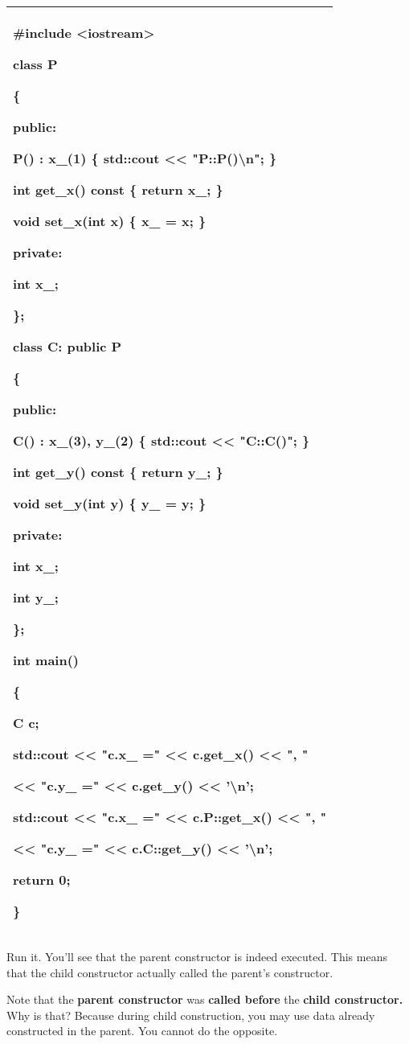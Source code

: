 \documentclass[
]{article}
\begin{document}
\begin{longtable}[]{@{}l@{}}
\toprule
\endhead
\begin{minipage}[t]{0.97\columnwidth}\raggedright
\#include \textless iostream\textgreater{}

class P

\{

public:

P() : x\_(1) \{ \textbf{std::cout \textless\textless{}
"P::P()\textbackslash n"; }\}

int get\_x() const \{ return x\_; \}

void set\_x(int x) \{ x\_ = x; \}

private:

int x\_;

\};

class C: public P

\{

public:

C() : x\_(3), y\_(2) \{ \textbf{std::cout \textless\textless{}
"C::C()";} \}

int get\_y() const \{ return y\_; \}

void set\_y(int y) \{ y\_ = y; \}

private:

int x\_;

int y\_;

\};

int main()

\{

C c;

std::cout \textless\textless{} "c.x\_ =" \textless\textless{} c.get\_x()
\textless\textless{} ", "

\textless\textless{} "c.y\_ =" \textless\textless{} c.get\_y()
\textless\textless{} '\textbackslash n';

std::cout \textless\textless{} "c.x\_ =" \textless\textless{}
c.P::get\_x() \textless\textless{} ", "

\textless\textless{} "c.y\_ =" \textless\textless{} c.C::get\_y()
\textless\textless{} '\textbackslash n';

return 0;

\}\strut
\end{minipage}\tabularnewline
\bottomrule
\end{longtable}

Run it. You'll see that the parent constructor is indeed executed. This
means that the child constructor actually called the parent's
constructor.

Note that the \textbf{parent constructor }was \textbf{called before
}the\textbf{ child constructor.} Why is that? Because during child
construction, you may use data already constructed in the parent. You
cannot do the opposite.
\end{document}
